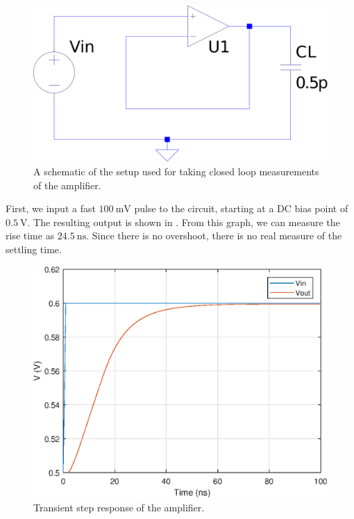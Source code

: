 \documentclass[journal,hidelinks]{IEEEtran}
\begin{document}
\begin{figure}[!htb]
  \centering
  \includegraphics[width=\columnwidth]{schematics/closed-loop-setup.pdf}
  \caption{A schematic of the setup used for taking closed loop measurements of the amplifier.}
  \label{fig:closed-loop-setup}
\end{figure}

First, we input a fast $\SI{100}{\milli\volt}$ pulse to the circuit, starting at a DC bias point of $\SI{0.5}{\volt}$. The resulting output is shown in . From this graph, we can measure the rise time as $\SI{24.5}{\nano\second}$. Since there is no overshoot, there is no real measure of the settling time.

\begin{figure}[!htb]
  \centering
  \includegraphics[width=\columnwidth]{figures/tran_step.eps}
  \caption{Transient step response of the amplifier.}
  \label{fig:tran_step}
\end{figure}
\end{document}
